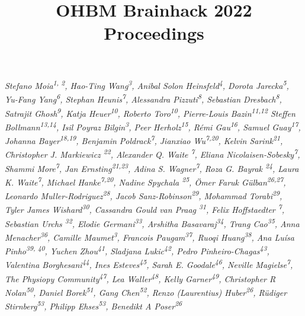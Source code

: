 \documentclass[10pt,a4paper,twocolumns]{proc}
\title{OHBM Brainhack 2022 Proceedings}
\newcommand{\authors}[1]{\emph{\footnotesize #1} \\}
\begin{document}
\maketitle

\authors{Stefano Moia\textsuperscript{1, 2}, %
Hao-Ting Wang\textsuperscript{3}, %
Anibal Solon Heinsfeld\textsuperscript{4}, %
Dorota Jarecka\textsuperscript{5}, %
Yu-Fang Yang\textsuperscript{6}, %
Stephan Heunis\textsuperscript{7}, %
Alessandra Pizzuti\textsuperscript{8}, %
Sebastian Dresbach\textsuperscript{8}, %
Satrajit Ghosh\textsuperscript{9}, %
Katja Heuer\textsuperscript{10}, %
Roberto Toro\textsuperscript{10}, %
Pierre-Louis Bazin\textsuperscript{11,12} %
Steffen Bollmann\textsuperscript{13,14}, %
Isil Poyraz Bilgin\textsuperscript{3}, %
Peer Herholz\textsuperscript{15}, %
Rémi Gau\textsuperscript{16}, %
Samuel Guay\textsuperscript{17}, %
Johanna Bayer\textsuperscript{18,19}, %
Benjamin Poldrack\textsuperscript{7}, %
Jianxiao Wu\textsuperscript{7,20}, %
Kelvin Sarink\textsuperscript{21}, %
Christopher J. Markiewicz \textsuperscript{22}, %
Alexander Q. Waite \textsuperscript{7}, %
Eliana Nicolaisen-Sobesky\textsuperscript{7}, %
Shammi More\textsuperscript{7}, %
Jan Ernsting\textsuperscript{21,23}, %
Adina S. Wagner\textsuperscript{7}, %
Roza G. Bayrak \textsuperscript{24}, %
Laura K. Waite\textsuperscript{7}, %
Michael Hanke\textsuperscript{7,20}, %
Nadine Spychala \textsuperscript{25}, %
\"Omer Faruk G\"ulban\textsuperscript{26,27}, %
Leonardo Muller-Rodriguez\textsuperscript{28}, %
Jacob Sanz-Robinson\textsuperscript{29}, %
Mohammad Torabi\textsuperscript{29}, %
Tyler James Wishard\textsuperscript{30}, %
Cassandra Gould van Praag \textsuperscript{31}, %
Felix Hoffstaedter \textsuperscript{7}, %
Sebastian Urchs \textsuperscript{32}, %
Elodie Germani\textsuperscript{33}, %
Arshitha Basavaraj\textsuperscript{34}, %
Trang Cao\textsuperscript{35}, %
Anna Menacher\textsuperscript{36}, %
Camille Maumet\textsuperscript{3}, %
Francois Paugam\textsuperscript{37}, %
Ruoqi Huang\textsuperscript{38}, %
Ana Luísa Pinho\textsuperscript{39, 40}, %
Yuchen Zhou\textsuperscript{41}, %
Sladjana Lukic\textsuperscript{42}, %
Pedro Pinheiro-Chagas\textsuperscript{43}, %
Valentina Borghesani\textsuperscript{44}, %
Ines Esteves\textsuperscript{45}, %
Sarah E. Goodale\textsuperscript{46}, %
Neville Magielse\textsuperscript{7}, %
The Physiopy Community\textsuperscript{47}, %
Lea Waller\textsuperscript{48}, %
Kelly Garner\textsuperscript{49}, %
Christopher R Nolan\textsuperscript{50}, %
Daniel Borek\textsuperscript{51}, %
Gang Chen\textsuperscript{52}, %
Renzo (Laurentius) Huber\textsuperscript{26}, %
R\"udiger Stirnberg\textsuperscript{53}, %
Philipp Ehses\textsuperscript{53}, %
Benedikt A Poser\textsuperscript{26}
}
\end{document}
